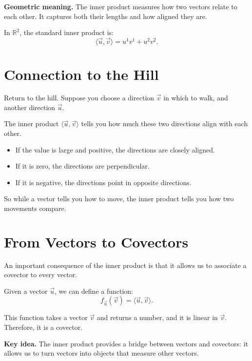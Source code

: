\documentclass[11pt,openany]{book}
\theoremstyle{definition}
\begin{document}
\medskip

\textbf{Geometric meaning.} The inner product measures how two vectors relate to 
each other. It captures both their lengths and how aligned they are.

\medskip

In $\mathbb{R}^2$, the standard inner product is:
\[
\langle \vec{u}, \vec{v} \rangle = u^1 v^1 + u^2 v^2.
\]

\medskip

\section{Connection to the Hill}

Return to the hill. Suppose you choose a direction $\vec{v}$ in which to walk, and 
another direction $\vec{u}$.

\medskip

The inner product $\langle \vec{u}, \vec{v} \rangle$ tells you how much these two 
directions align with each other.

\begin{itemize}
  \item If the value is large and positive, the directions are closely aligned.
  \item If it is zero, the directions are perpendicular.
  \item If it is negative, the directions point in opposite directions.
\end{itemize}

\medskip

So while a vector tells you how to move, the inner product tells you how two 
movements compare.

\medskip

\section{From Vectors to Covectors}

An important consequence of the inner product is that it allows us to associate a 
covector to every vector.

\medskip

Given a vector $\vec{u}$, we can define a function:
\[
f_{\vec{u}}(\vec{v}) = \langle \vec{u}, \vec{v} \rangle.
\]

\medskip

This function takes a vector $\vec{v}$ and returns a number, and it is linear in 
$\vec{v}$. Therefore, it is a covector.

\medskip

\textbf{Key idea.} The inner product provides a bridge between vectors and 
covectors: it allows us to turn vectors into objects that measure other vectors.
\end{document}
